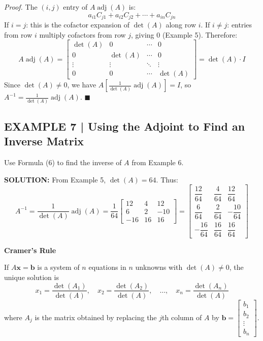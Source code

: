 \documentclass{article}
\newcommand{\redheading}[1]{{\vspace{2mm}\noindent\Large\bfseries\color{red!55!black} #1\par}\vspace{2mm}}
\theoremstyle{mystyle}
\begin{document}
\textit{Proof.} The $(i,j)$ entry of $A\operatorname{adj}(A)$ is:
\begin{equation}
a_{i1}C_{j1}+a_{i2}C_{j2}+\cdots+a_{in}C_{jn} \tag{7}
\end{equation}
If $i=j$: this is the cofactor expansion of $\det(A)$ along row $i$.
If $i\neq j$: entries from row $i$ multiply cofactors from row $j$, giving $0$ (Example 5).
Therefore:
\begin{equation}
A\operatorname{adj}(A)=\begin{bmatrix}\det(A)&0&\cdots&0\\0&\det(A)&\cdots&0\\
\vdots&\vdots&\ddots&\vdots\\0&0&\cdots&\det(A)\end{bmatrix}=\det(A)\cdot I \tag{8}
\end{equation}
Since $\det(A)\neq 0$, we have $A\!\left[\tfrac{1}{\det(A)}\operatorname{adj}(A)\right]=I$,
so $A^{-1}=\tfrac{1}{\det(A)}\operatorname{adj}(A)$. $\blacksquare$

\subsection*{EXAMPLE 7 | Using the Adjoint to Find an Inverse Matrix}

Use Formula (6) to find the inverse of $A$ from Example 6.

\textbf{SOLUTION:} From Example 5, $\det(A)=64$. Thus:
\[
A^{-1}=\frac{1}{\det(A)}\operatorname{adj}(A)=\frac{1}{64}\begin{bmatrix}12&4&12\\6&2&-10\\-16&16&16\end{bmatrix}
=\begin{bmatrix}\dfrac{12}{64}&\dfrac{4}{64}&\dfrac{12}{64}\\[8pt]
\dfrac{6}{64}&\dfrac{2}{64}&-\dfrac{10}{64}\\[8pt]
-\dfrac{16}{64}&\dfrac{16}{64}&\dfrac{16}{64}\end{bmatrix}
\]

\redheading{Cramer's Rule}

\begin{tcolorbox}[colback=red!4, colframe=red!60!black,
  title={\textbf{Theorem 2.3.7 --- Cramer's Rule}}, boxrule=0.5mm, arc=3mm]
If $A\mathbf{x}=\mathbf{b}$ is a system of $n$ equations in $n$ unknowns with $\det(A)\neq 0$,
the unique solution is
\[
x_1=\frac{\det(A_1)}{\det(A)},\quad
x_2=\frac{\det(A_2)}{\det(A)},\quad\ldots,\quad
x_n=\frac{\det(A_n)}{\det(A)}
\]
where $A_j$ is the matrix obtained by replacing the $j$th column of $A$ by
$\mathbf{b}=\begin{bmatrix}b_1\\b_2\\\vdots\\b_n\end{bmatrix}$.
\end{tcolorbox}
\end{document}

